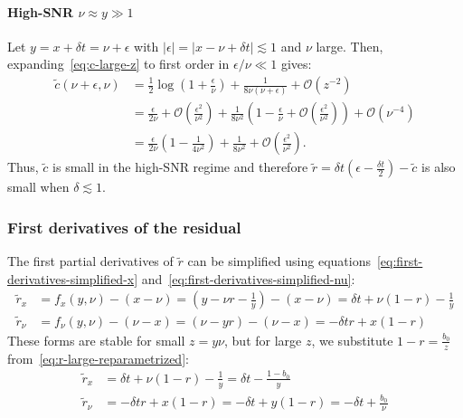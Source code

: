 \documentclass{article}
\begin{document}
\paragraph{High-SNR $\nu \approx y \gg 1$}

Let $y = x + \delta t = \nu + \epsilon$ with $|\epsilon| = |x - \nu + \delta t| \lesssim 1$ and $\nu$ large.
Then, expanding~\eqref{eq:c-large-z} to first order in $\epsilon/\nu \ll 1$ gives:
%
\begin{align}
  \tilde{c}(\nu+\epsilon, \nu) & = \frac{1}{2}\log\left(1 + \frac{\epsilon}{\nu}\right) + \frac{1}{8\nu(\nu+\epsilon)} + \mathcal{O}(z^{-2})                                                                                                   \\
                               & = \frac{\epsilon}{2\nu} + \mathcal{O}\left(\frac{\epsilon^2}{\nu^2}\right) + \frac{1}{8\nu^2}\left(1 - \frac{\epsilon}{\nu} + \mathcal{O}\left(\frac{\epsilon^2}{\nu^2}\right)\right) + \mathcal{O}(\nu^{-4}) \\
                               & = \frac{\epsilon}{2\nu}\left(1 - \frac{1}{4\nu^2}\right) + \frac{1}{8\nu^2} + \mathcal{O}\left(\frac{\epsilon^2}{\nu^2}\right).
\end{align}
%
Thus, $\tilde{c}$ is small in the high-SNR regime and therefore $\tilde{r} = \delta t (\epsilon - \frac{\delta t}{2}) - \tilde{c}$ is also small when $\delta \lesssim 1$.

\subsubsection{First derivatives of the residual}\label{sec:first-derivatives-residual}

The first partial derivatives of $\tilde{r}$ can be simplified using equations~\eqref{eq:first-derivatives-simplified-x} and~\eqref{eq:first-derivatives-simplified-nu}:
%
\begin{align}
  \tilde{r}_x   & = f_x(y,\nu) - (x-\nu) = (y - \nu r - \frac{1}{y}) - (x-\nu) = \delta t  + \nu (1 - r) - \frac{1}{y} \\
  \tilde{r}_\nu & = f_\nu(y,\nu) - (\nu-x) = (\nu - y r) - (\nu-x) = -\delta t r + x (1 - r)
\end{align}
%
These forms are stable for small $z = y \nu$, but for large $z$, we substitute $1-r = \frac{b_0}{z}$ from~\eqref{eq:r-large-reparametrized}:
%
\begin{align}
  \tilde{r}_x   & = \delta t  + \nu (1 - r) - \frac{1}{y} = \delta t - \frac{1 - b_0}{y}          \\
  \tilde{r}_\nu & = -\delta t r + x (1 - r) = -\delta t + y (1 - r) = -\delta t + \frac{b_0}{\nu}
\end{align}
\end{document}
